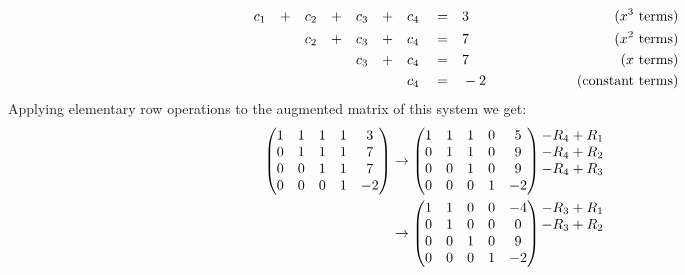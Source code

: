 \documentclass[12pt]{article}
\newenvironment{problem}[2][Problem]
{
	\begin{trivlist} 
		\item[\hskip \labelsep {\bfseries #1 #2:}]
	}
{
	\end{trivlist}
	}
\newenvironment{solution}[1][Solution]
{
	\begin{trivlist} 
		\item[\hskip \labelsep {\itshape #1:}]
	}
	{
	\end{trivlist}
}
\begin{document}
\begin{problem}{5}
\begin{solution}
\begin{align*}
&&&&&&&& &&&&&&&& &&&&&&&& &c_1& &+& &c_2& &+& &c_3& &+& &c_4& &=& &3&  &&&&&&&& \hphantom{100} \text{($x^3$ terms)} &&&&&&&& &&&&&&&& \\
&&&&&&&& &&&&&&&& &&&&&&&& &\hphantom{1}& &\hphantom{1}& &c_2& &+& &c_3& &+& &c_4& &=& &7&  &&&&&&&& \hphantom{100} \text{($x^2$ terms)} &&&&&&&& &&&&&&&& \\
&&&&&&&& &&&&&&&& &&&&&&&& &\hphantom{1}& &\hphantom{1}& &\hphantom{1}& &\hphantom{1}& &c_3& &+& &c_4& &=& &7&  &&&&&&&& \hphantom{100} \text{($x$ terms)} &&&&&&&& &&&&&&&& \\
&&&&&&&& &&&&&&&& &&&&&&&& &\hphantom{1}& &\hphantom{1}& &\hphantom{1}& &\hphantom{1}& &\hphantom{1}& &\hphantom{1}& &c_4& &=& &-2&  &&&&&&&&  \hphantom{100} \text{(constant terms)} &&&&&&&& &&&&&&&&
\end{align*}
Applying elementary row operations to the augmented matrix of this system we get:
\begin{align*}
\begin{pmatrix} 1&1&1&1&3\\ 0&1&1&1&7 \\ 0&0&1&1&7 \\ 0&0&0&1&-2\end{pmatrix} &\rightarrow \begin{pmatrix} 1&1&1&0&5\\ 0&1&1&0&9 \\ 0&0&1&0&9 \\ 0&0&0&1&-2\end{pmatrix} \begin{matrix} -R_4+R_1\hphantom{1} \\ -R_4 +R_2\hphantom{1} \\ -R_4 +R_3\hphantom{1} \\ \hphantom{1} \end{matrix}\\
&\rightarrow \begin{pmatrix} 1&1&0&0&-4 \\ 0&1&0&0&0 \\ 0&0&1&0&9 \\ 0&0&0&1&-2\end{pmatrix} \begin{matrix} -R_3+R_1\hphantom{1} \\ -R_3 +R_2\hphantom{1} \\ \hphantom{1} \\ \hphantom{1} \end{matrix}\\

\end{align*}
\end{solution}
\end{problem}
\end{document}
